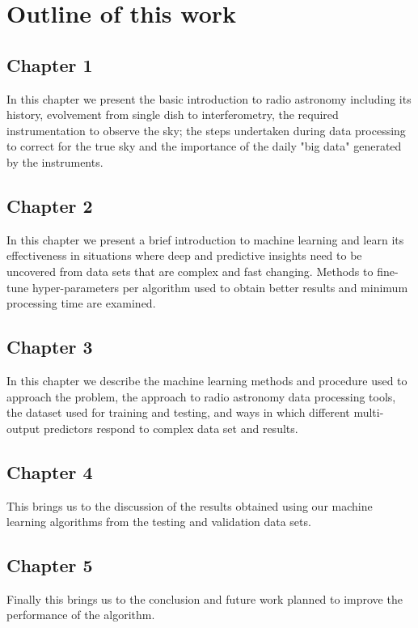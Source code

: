 \chapter*{Outline of this work}

\section*{Chapter 1}
In this chapter we present the basic introduction to radio astronomy including its history, evolvement from single dish to interferometry, the required instrumentation to observe the sky; the steps undertaken during data processing to correct for the true sky and the importance of the daily "big data" generated by the instruments.    
\section*{Chapter 2}
In this chapter we present a brief introduction to machine learning and learn its effectiveness in situations where deep and predictive insights need to be uncovered from data sets that are complex and fast changing. Methods to fine-tune hyper-parameters per algorithm used to obtain better results and minimum processing time are examined.  
\section*{Chapter 3}
In this chapter we describe the machine learning methods and procedure used to approach the problem, the approach to radio astronomy data processing tools, the dataset used for training and testing, and ways in which different multi-output predictors respond to complex data set and results.
\section*{Chapter 4}
This brings us to the discussion of the results obtained using our machine learning algorithms from the testing and validation data sets. 
\section*{Chapter 5}
Finally this brings us to the conclusion and future work planned to improve the performance of the algorithm.

